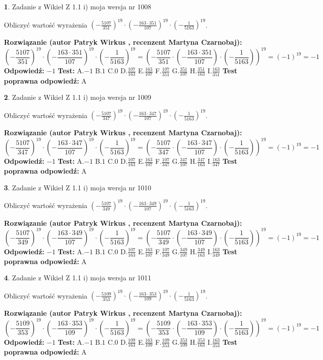\documentclass[12pt, a4paper]{article}
\theoremstyle{definition} %
\newtheorem{zad}{}
\newcommand{\zadStart}[1]{\begin{zad}#1\newline}
\newcommand{\zadStop}{\end{zad}}
\newcommand{\rozwStart}[2]{\noindent \textbf{Rozwiązanie (autor #1 , recenzent #2): }\newline}
\newcommand{\rozwStop}{\newline}
\newcommand{\odpStart}{\noindent \textbf{Odpowiedź:}\newline}
\newcommand{\odpStop}{\newline}
\newcommand{\testStart}{\noindent \textbf{Test:}\newline}
\newcommand{\testStop}{\newline}
\newcommand{\kluczStart}{\noindent \textbf{Test poprawna odpowiedź:}\newline}
\newcommand{\kluczStop}{\newline}
\begin{document}
\zadStart{Zadanie z Wikieł Z 1.1 i) moja wersja nr 1008}

Obliczyć wartość wyrażenia $(-\frac{5107}{351})^{19} \cdot (-\frac{163 \cdot 351}{107})^{19} \cdot (-\frac{1}{5163})^{19}$.
\zadStop
\rozwStart{Patryk Wirkus}{Martyna Czarnobaj}
$$(-\frac{5107}{351})^{19} \cdot (-\frac{163 \cdot 351}{107})^{19} \cdot (-\frac{1}{5163})^{19} = (-\frac{5107}{351} \cdot (-\frac{163 \cdot 351}{107}) \cdot (-\frac{1}{5163}))^{19} = (-1)^{19} = -1$$
\rozwStop
\odpStart
$-1$
\odpStop
\testStart
A.$-1$ B.$1$ C.$0$ D.$\frac{107}{163}$ E.$\frac{163}{107}$
F.$\frac{107}{351}$ G.$\frac{351}{107}$
H.$\frac{351}{163}$
I.$\frac{163}{351}$
\testStop
\kluczStart
A
\kluczStop



\zadStart{Zadanie z Wikieł Z 1.1 i) moja wersja nr 1009}

Obliczyć wartość wyrażenia $(-\frac{5107}{347})^{19} \cdot (-\frac{163 \cdot 347}{107})^{19} \cdot (-\frac{1}{5163})^{19}$.
\zadStop
\rozwStart{Patryk Wirkus}{Martyna Czarnobaj}
$$(-\frac{5107}{347})^{19} \cdot (-\frac{163 \cdot 347}{107})^{19} \cdot (-\frac{1}{5163})^{19} = (-\frac{5107}{347} \cdot (-\frac{163 \cdot 347}{107}) \cdot (-\frac{1}{5163}))^{19} = (-1)^{19} = -1$$
\rozwStop
\odpStart
$-1$
\odpStop
\testStart
A.$-1$ B.$1$ C.$0$ D.$\frac{107}{163}$ E.$\frac{163}{107}$
F.$\frac{107}{347}$ G.$\frac{347}{107}$
H.$\frac{347}{163}$
I.$\frac{163}{347}$
\testStop
\kluczStart
A
\kluczStop



\zadStart{Zadanie z Wikieł Z 1.1 i) moja wersja nr 1010}

Obliczyć wartość wyrażenia $(-\frac{5107}{349})^{19} \cdot (-\frac{163 \cdot 349}{107})^{19} \cdot (-\frac{1}{5163})^{19}$.
\zadStop
\rozwStart{Patryk Wirkus}{Martyna Czarnobaj}
$$(-\frac{5107}{349})^{19} \cdot (-\frac{163 \cdot 349}{107})^{19} \cdot (-\frac{1}{5163})^{19} = (-\frac{5107}{349} \cdot (-\frac{163 \cdot 349}{107}) \cdot (-\frac{1}{5163}))^{19} = (-1)^{19} = -1$$
\rozwStop
\odpStart
$-1$
\odpStop
\testStart
A.$-1$ B.$1$ C.$0$ D.$\frac{107}{163}$ E.$\frac{163}{107}$
F.$\frac{107}{349}$ G.$\frac{349}{107}$
H.$\frac{349}{163}$
I.$\frac{163}{349}$
\testStop
\kluczStart
A
\kluczStop



\zadStart{Zadanie z Wikieł Z 1.1 i) moja wersja nr 1011}

Obliczyć wartość wyrażenia $(-\frac{5109}{353})^{19} \cdot (-\frac{163 \cdot 353}{109})^{19} \cdot (-\frac{1}{5163})^{19}$.
\zadStop
\rozwStart{Patryk Wirkus}{Martyna Czarnobaj}
$$(-\frac{5109}{353})^{19} \cdot (-\frac{163 \cdot 353}{109})^{19} \cdot (-\frac{1}{5163})^{19} = (-\frac{5109}{353} \cdot (-\frac{163 \cdot 353}{109}) \cdot (-\frac{1}{5163}))^{19} = (-1)^{19} = -1$$
\rozwStop
\odpStart
$-1$
\odpStop
\testStart
A.$-1$ B.$1$ C.$0$ D.$\frac{109}{163}$ E.$\frac{163}{109}$
F.$\frac{109}{353}$ G.$\frac{353}{109}$
H.$\frac{353}{163}$
I.$\frac{163}{353}$
\testStop
\kluczStart
A
\kluczStop
\end{document}
